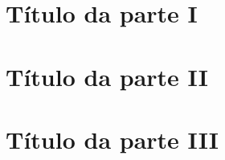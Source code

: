 \documentclass[
	12pt,				%
	openright,			%
	twoside,			%
	a4paper,			%
	english,			%
	french,				%
	spanish,			%
	brazil,				%
	]{abntex2}
\begin{document}
\part{Título da parte I}






\part{Título da parte II}







\part{Título da parte III}






% 




\postextual




%
%
\end{document}

